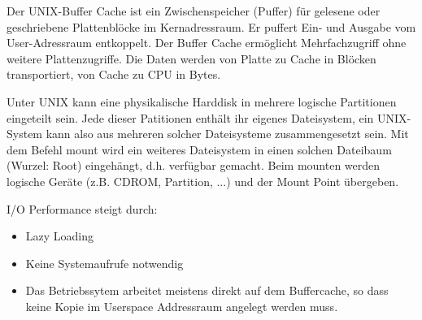 \begin{answer}
Der UNIX-Buffer Cache ist ein Zwischenspeicher (Puffer) für gelesene oder geschriebene Plattenblöcke im Kernadressraum. Er puffert Ein- und Ausgabe vom User-Adressraum entkoppelt. Der Buffer Cache ermöglicht Mehrfachzugriff ohne weitere Plattenzugriffe. Die Daten werden von Platte zu Cache in Blöcken transportiert, von Cache zu CPU in Bytes.
\end{answer}

\begin{answer}
Unter UNIX kann eine physikalische Harddisk in mehrere logische Partitionen eingeteilt sein. Jede dieser Patitionen enthält ihr eigenes Dateisystem, ein UNIX-System kann also aus mehreren solcher Dateisysteme zusammengesetzt sein. Mit dem Befehl mount wird ein weiteres Dateisystem in einen solchen Dateibaum (Wurzel: Root) eingehängt, d.h. verfügbar gemacht. Beim mounten werden logische Geräte (z.B. CDROM, Partition, ...) und der Mount Point übergeben.
\end{answer}

\begin{answer}
I/O Performance steigt durch:

\begin{itemize}
\item Lazy Loading 
\item Keine Systemaufrufe notwendig
\item Das Betriebssytem arbeitet meistens direkt auf dem Buffercache, so dass keine Kopie im Userspace Addressraum angelegt werden muss.
\end{itemize}

\end{answer}

